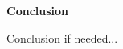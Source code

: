 \vspace{1.5cm}
\begin{center}
\Huge{{\bf Conclusion}}
\end{center}
\vspace{0.5cm}
Conclusion if needed...